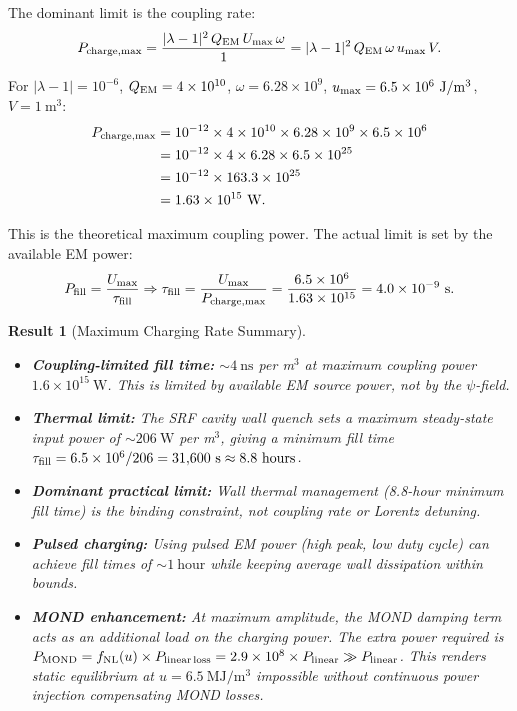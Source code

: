 \documentclass[aps,prd,twocolumn,superscriptaddress]{revtex4-2}
\newcommand{\lam}{|\lambda-1|}
\newtheorem{result}{Result}
\begin{document}
The dominant limit is the coupling rate:
\begin{equation}
P_{\rm charge,max} = \frac{\lam^2\,Q_{\rm EM}\,U_{\rm max}\,\omega}{1}
= \lam^2\,Q_{\rm EM}\,\omega\,u_{\rm max}\,V.
\end{equation}

For $\lam = 10^{-6}$, $Q_{\rm EM} = 4\times 10^{10}$,
$\omega = 6.28\times 10^9$, $u_{\rm max} = 6.5\times 10^6~\mathrm{J/m^3}$,
$V = 1~\mathrm{m^3}$:
\begin{align}
P_{\rm charge,max} &= 10^{-12}\times 4\times 10^{10}
\times 6.28\times 10^9\times 6.5\times 10^6 \notag\\
&= 10^{-12}\times 4\times 6.28\times 6.5\times 10^{25} \notag\\
&= 10^{-12}\times 163.3\times 10^{25} \notag\\
&= 1.63\times 10^{15}~\mathrm{W}.
\end{align}

This is the theoretical maximum coupling power.  The actual limit is
set by the available EM power:
\begin{equation}
P_{\rm fill} = \frac{U_{\rm max}}{\tau_{\rm fill}}
\Rightarrow \tau_{\rm fill} = \frac{U_{\rm max}}{P_{\rm charge,max}}
= \frac{6.5\times 10^6}{1.63\times 10^{15}} = 4.0\times 10^{-9}~\mathrm{s}.
\end{equation}

\begin{result}[Maximum Charging Rate Summary]
\begin{itemize}
\item \textbf{Coupling-limited fill time:} $\sim 4~\mathrm{ns}$ per m$^3$
at maximum coupling power $1.6\times 10^{15}~\mathrm{W}$.  This is
limited by available EM source power, not by the $\psi$-field.
\item \textbf{Thermal limit:} The SRF cavity wall quench sets a
maximum steady-state input power of $\sim 206~\mathrm{W}$ per m$^3$,
giving a minimum fill time $\tau_{\rm fill} = 6.5\times 10^6/206
= 31{,}600~\mathrm{s} \approx 8.8~\mathrm{hours}$.
\item \textbf{Dominant practical limit:} Wall thermal management
(8.8-hour minimum fill time) is the binding constraint, not coupling
rate or Lorentz detuning.
\item \textbf{Pulsed charging:} Using pulsed EM power (high peak,
low duty cycle) can achieve fill times of $\sim 1~\mathrm{hour}$ while
keeping average wall dissipation within bounds.
\item \textbf{MOND enhancement:} At maximum amplitude, the MOND
damping term acts as an additional load on the charging power.  The
extra power required is $P_{\rm MOND} = f_{\rm NL}(u)\times P_{\rm linear\,loss}
= 2.9\times 10^8\times P_{\rm linear} \gg P_{\rm linear}$.  This
renders static equilibrium at $u = 6.5~\mathrm{MJ/m^3}$
impossible without continuous power injection compensating MOND losses.
\end{itemize}
\end{result}
\end{document}
